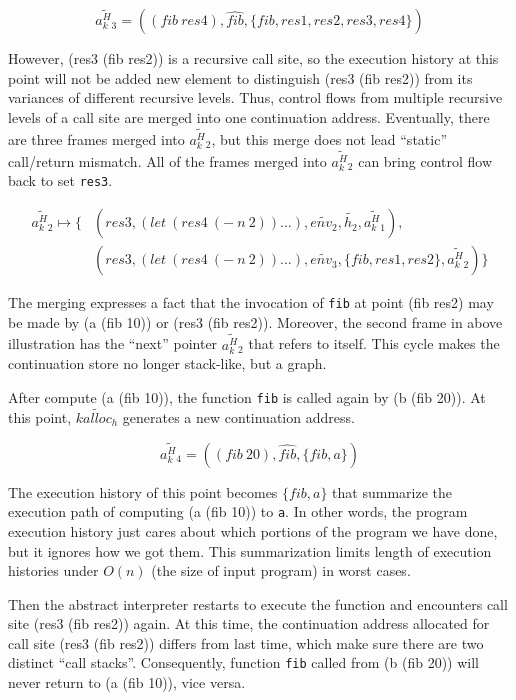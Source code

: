 \documentclass{article}
\begin{document}
\[
\widetilde{a^H_k{}_3} = ((fib\ res4), \widehat{fib}, \{fib, res1, res2, res3, res4\})
\]

However, (res3 (fib res2)) is a recursive call site, so the execution history at this point will not be added new element to distinguish (res3 (fib res2)) from its variances of different recursive levels. Thus, control flows from multiple recursive levels of a call site are merged into one continuation address. Eventually, there are three frames merged into $\widetilde{a^H_k{}_2}$, but this merge does not lead ``static'' call/return mismatch. All of the frames merged into $\widetilde{a^H_k{}_2}$ can bring control flow back to set \verb|res3|.

\[
\begin{aligned}
\label{eq:show-stack}
\widetilde{a^H_k{}_2} \mapsto \{ {}& (res3, (let\ (res4\ (-\ n\ 2)) \dots), \widetilde{env_2}, \tilde{h_2}, \widetilde{a^H_k{}_1}), {} \\
                                 {}& (res3, (let\ (res4\ (-\ n\ 2)) \dots), \widetilde{env_3}, \{fib, res1, res2\}, \widetilde{a^H_k{}_2}) \}
\end{aligned}
\]

The merging expresses a fact that the invocation of \verb|fib| at point (fib res2) may be made by (a (fib 10)) or (res3 (fib res2)). Moreover, the second frame in above illustration has the ``next'' pointer $\widetilde{a^H_k{}_2}$ that refers to itself. This cycle makes the continuation store no longer stack-like, but a graph.

After compute (a (fib 10)), the function \verb|fib| is called again by (b (fib 20)). At this point, $\widetilde{kalloc_h}$ generates a new continuation address.

\[
\widetilde{a^H_k{}_4} = ((fib\ 20), \widehat{fib}, \{fib, a\})
\]

The execution history of this point becomes $\{fib, a\}$ that summarize the execution path of computing (a (fib 10)) to \verb|a|. In other words, the program execution history just cares about which portions of the program we have done, but it ignores how we got them. This summarization limits length of execution histories under $O(\textit{n})$ (the size of input program) in worst cases.

Then the abstract interpreter restarts to execute the function and encounters call site (res3 (fib res2)) again. At this time, the continuation address allocated for call site (res3 (fib res2)) differs from last time, which make sure there are two distinct ``call stacks''. Consequently, function \verb|fib| called from (b (fib 20)) will never return to (a (fib 10)), vice versa.
\end{document}

